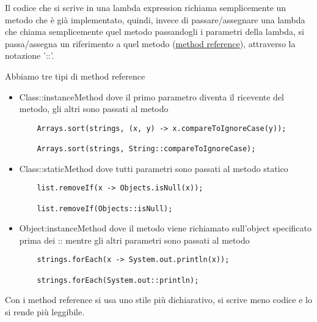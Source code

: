 Il codice che si scrive in una lambda expression richiama semplicemente un metodo che è già implementato, quindi, invece di passare/assegnare una lambda che 
chiama semplicemente quel metodo passandogli i parametri della lambda, si passa/assegna un riferimento a quel metodo (\underline{method reference}), attraverso la 
notazione '::'.
\smallskip

Abbiamo tre tipi di method reference
\begin{itemize}
    \item Class::instanceMethod dove il primo parametro diventa il ricevente del metodo, gli altri sono passati al metodo
    \begin{lstlisting}
    Arrays.sort(strings, (x, y) -> x.compareToIgnoreCase(y));

    Arrays.sort(strings, String::compareToIgnoreCase);
    \end{lstlisting}
    \item Class::staticMethod dove tutti parametri sono passati al metodo statico
    \begin{lstlisting}
    list.removeIf(x -> Objects.isNull(x));
    
    list.removeIf(Objects::isNull);
    \end{lstlisting}
    \item Object:instanceMethod dove il metodo viene richiamato sull’object specificato prima dei :: mentre gli altri parametri sono passati al metodo
    \begin{lstlisting}
    strings.forEach(x -> System.out.println(x));

    strings.forEach(System.out::println);
    \end{lstlisting}
\end{itemize}

Con i method reference si usa uno stile più dichiarativo, si scrive meno codice e lo si rende più leggibile.
